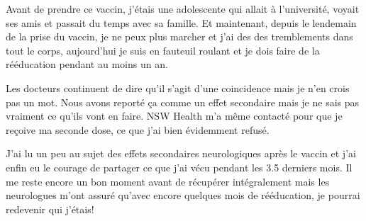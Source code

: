 Avant de prendre ce vaccin, j'étais une adolescente qui allait à l'université,
voyait ses amis et passait du temps avec sa famille. Et maintenant, depuis le
lendemain de la prise du vaccin, je ne peux plus marcher et j'ai des des
tremblements dans tout le corps, aujourd'hui je suis en fauteuil roulant et je
dois faire de la rééducation pendant au moins un an.

Les docteurs continuent de dire qu'il s'agit d'une coincidence mais je n'en
crois pas un mot. Nous avons reporté ça comme un effet secondaire mais je ne
sais pas vraiment ce qu'ils vont en faire. NSW Health m'a même contacté pour que
je reçoive ma seconde dose, ce que j'ai bien évidemment refusé.

J'ai lu un peu au sujet des effets secondaires neurologiques après le vaccin et
j'ai enfin eu le courage de partager ce que j'ai vécu pendant les 3.5 derniers
mois. Il me reste encore un bon moment avant de récupérer intégralement mais les
neurologues m'ont assuré qu'avec encore quelques mois de rééducation, je pourrai
redevenir qui j'étais!
